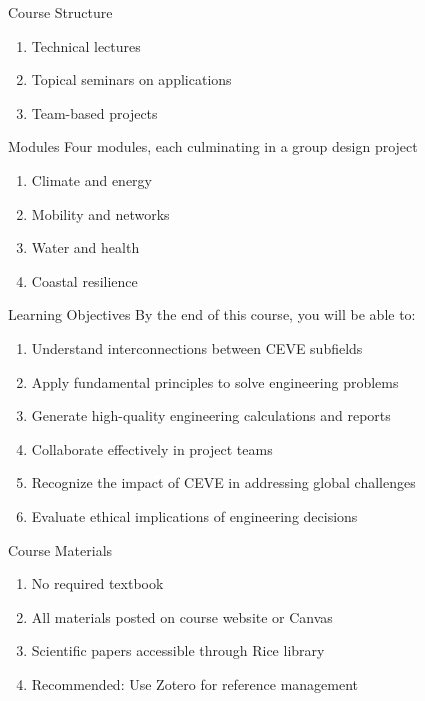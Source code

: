 \documentclass[
  ignorenonframetext,
]{beamer}
\providecommand{\tightlist}{%
  \setlength{\itemsep}{0pt}\setlength{\parskip}{0pt}}\usepackage{longtable,booktabs,array}
\begin{document}
\begin{frame}{Course Structure}
\label{course-structure}
\begin{enumerate}
\tightlist
\item
  Technical lectures
\item
  Topical seminars on applications
\item
  Team-based projects
\end{enumerate}
\end{frame}

\begin{frame}{Modules}
\label{modules}
Four modules, each culminating in a group design project

\begin{enumerate}
\tightlist
\item
  Climate and energy
\item
  Mobility and networks
\item
  Water and health
\item
  Coastal resilience
\end{enumerate}
\end{frame}

\begin{frame}{Learning Objectives}
\label{learning-objectives}
By the end of this course, you will be able to:

\begin{enumerate}
\tightlist
\item
  Understand interconnections between CEVE subfields
\item
  Apply fundamental principles to solve engineering problems
\item
  Generate high-quality engineering calculations and reports
\item
  Collaborate effectively in project teams
\item
  Recognize the impact of CEVE in addressing global challenges
\item
  Evaluate ethical implications of engineering decisions
\end{enumerate}
\end{frame}

\begin{frame}{Course Materials}
\label{course-materials}
\begin{enumerate}
\tightlist
\item
  No required textbook
\item
  All materials posted on course website or Canvas
\item
  Scientific papers accessible through Rice library
\item
  Recommended: Use Zotero for reference management
\end{enumerate}
\end{frame}
\end{document}
